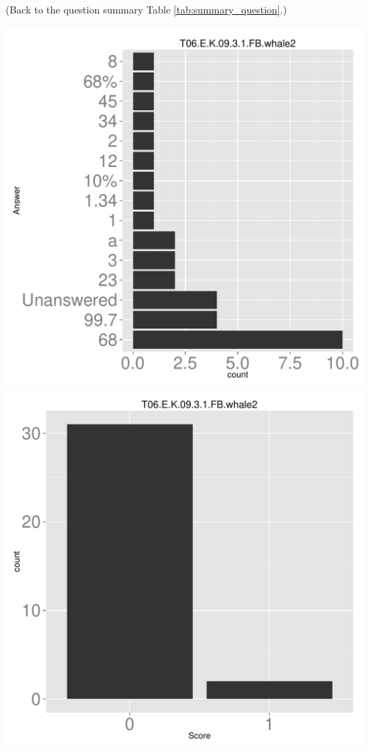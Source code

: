 \documentclass[12pt,nohyper]{tufte-handout}\usepackage[]{graphicx}\usepackage[]{color}
\begin{document}
 (Back to the question summary Table \ref{tab:summary_question}.)

\begin{center} \includegraphics[width=.45\linewidth]{Topic06_28_answer} \includegraphics[width=.45\linewidth]{Topic06_28_score} \end{center} 
\end{document}
